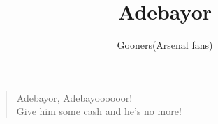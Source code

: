 \documentclass[a4paper,12pt]{article}
\title{Adebayor}
\author{Gooners(Arsenal fans)}
\date{}
\begin{document}
	
	\maketitle
	
	\begin{verse}
		
		Adebayor, Adebayoooooor! \\
		Give him some cash and he's no more!
		
	\end{verse}
	
\end{document}
